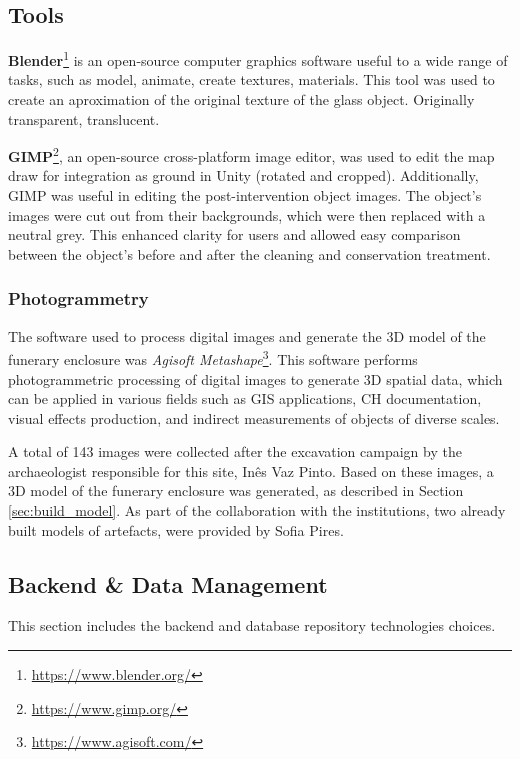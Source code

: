 \subsection{Tools}
\textbf{Blender}\footnote{\url{https://www.blender.org/}} is an open-source computer graphics software useful to a wide range of tasks, such as model, animate, create textures, materials. 
This tool was used to create an aproximation of the original texture of the glass object. Originally transparent, translucent.

\textbf{GIMP}\footnote{\url{https://www.gimp.org/}}, an open-source cross-platform image editor, was used to edit the map draw for integration as ground in Unity (rotated and cropped).
Additionally, GIMP was useful in editing the post-intervention object images. The object's images were cut out from their backgrounds, which were then replaced with a neutral grey. 
This enhanced clarity for users and allowed easy comparison between the object's before and after the cleaning and conservation treatment.

\subsubsection{Photogrammetry}
\label{sec:photogrammetry_tool} 

The software used to process digital images and generate the \gls{3D} model of the funerary enclosure was \textit{Agisoft Metashape}\footnote{\url{https://www.agisoft.com/}}.
This software performs photogrammetric processing of digital images to generate \gls{3D} spatial data, which can be applied in various fields such as \gls{GIS} applications, \gls{CH} documentation, visual effects production, and indirect measurements of objects of diverse scales. 

 A total of 143 images were collected after the excavation campaign by the archaeologist responsible for this site, Inês Vaz Pinto.
Based on these images, a \gls{3D} model of the funerary enclosure was generated, as described in Section \ref{sec:build_model}.
As part of the collaboration with the institutions, two already built models of artefacts, were provided by Sofia Pires.

\subsection{Backend \& Data Management}
This section includes the backend and database repository technologies choices. 
